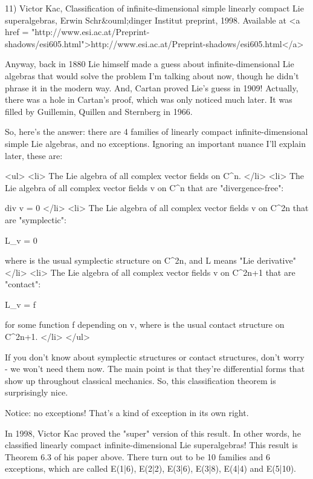 11) Victor Kac, Classification of infinite-dimensional simple 
linearly compact Lie superalgebras, Erwin Schr&ouml;dinger Institut 
preprint, 1998.
Available at <a href = "http://www.esi.ac.at/Preprint-shadows/esi605.html">http://www.esi.ac.at/Preprint-shadows/esi605.html</a>

Anyway, back in 1880 Lie himself made a guess about 
infinite-dimensional Lie algebras that would solve the problem 
I'm talking about now, though he didn't phrase it in the modern
way.  And, Cartan proved Lie's guess in 1909!  Actually, there 
was a hole in Cartan's proof, which was only noticed much later.  
It was filled by Guillemin, Quillen and Sternberg in 1966.

So, here's the answer: there are 4 families of linearly compact 
infinite-dimensional simple Lie algebras, and no exceptions.  
Ignoring an important nuance I'll explain later, these are:

<ul>
<li>
The Lie algebra of all complex vector fields on C^{n}.
</li>
<li>
The Lie algebra of all complex vector fields v on C^{n} 
that are "divergence-free":

    div v = 0
</li>
<li>
The Lie algebra of all complex vector fields v on C^{2n}
 that are "symplectic":

    L_{v} \omega  = 0

    where \omega  is the usual symplectic structure on C^{2n}, 
    and L means "Lie derivative"
</li>
<li>
The Lie algebra of all complex vector fields v on C^{2n+1} 
    that are "contact":

    L_{v} \alpha  = f \alpha 

    for some function f depending on v, where \alpha  is the usual
    contact structure on C^{2n+1}.
</li>
</ul>

If you don't know about symplectic structures or contact 
structures, don't worry - we won't need them now.  The main point 
is that they're differential forms that show up throughout 
classical mechanics.  So, this classification theorem is 
surprisingly nice.  

Notice: no exceptions!  That's a kind of exception in its own 
right. 

In 1998, Victor Kac proved the "super" version of this result.  
In other words, he classified linearly compact infinite-dimensional 
Lie superalgebras!  This result is Theorem 6.3 of his paper above.  
There turn out to be 10 families and 6 exceptions, which are 
called E(1|6), E(2|2), E(3|6), E(3|8), E(4|4) and E(5|10).

